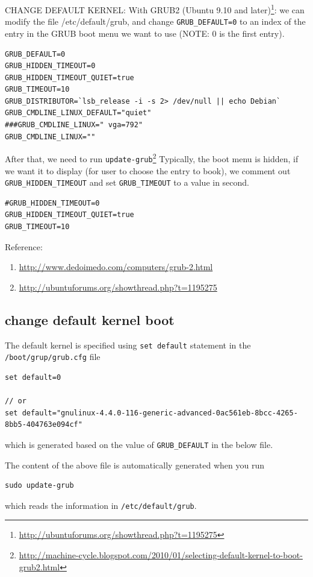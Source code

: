 CHANGE DEFAULT KERNEL: With GRUB2 (Ubuntu 9.10 and
  later)\footnote{\url{http://ubuntuforums.org/showthread.php?t=1195275}}: we
  can modify the file /etc/default/grub, and change \verb!GRUB_DEFAULT=0! to an
  index of the entry in the GRUB boot menu we want to use (NOTE: 0 is the first
  entry). 
  \begin{verbatim}
GRUB_DEFAULT=0
GRUB_HIDDEN_TIMEOUT=0
GRUB_HIDDEN_TIMEOUT_QUIET=true
GRUB_TIMEOUT=10
GRUB_DISTRIBUTOR=`lsb_release -i -s 2> /dev/null || echo Debian`
GRUB_CMDLINE_LINUX_DEFAULT="quiet"
###GRUB_CMDLINE_LINUX=" vga=792"
GRUB_CMDLINE_LINUX=""
  \end{verbatim}
After that, we need to run
\verb!update-grub!\footnote{\url{http://machine-cycle.blogspot.com/2010/01/selecting-default-kernel-to-boot-grub2.html}}
Typically, the boot menu is hidden, if we want it to display (for user to
choose the entry to book), we comment out \verb!GRUB_HIDDEN_TIMEOUT! and set
\verb!GRUB_TIMEOUT! to a value in second. 
\begin{verbatim}
#GRUB_HIDDEN_TIMEOUT=0
GRUB_HIDDEN_TIMEOUT_QUIET=true
GRUB_TIMEOUT=10
\end{verbatim}
  
  
  
  Reference:
  \begin{enumerate}
    \item \url{http://www.dedoimedo.com/computers/grub-2.html}
    \item \url{http://ubuntuforums.org/showthread.php?t=1195275}
  \end{enumerate}

\subsection{change default kernel boot}

The default kernel is specified using \verb!set default! statement in the 
\verb!/boot/grup/grub.cfg! file 
\begin{verbatim}
set default=0

// or 
set default="gnulinux-4.4.0-116-generic-advanced-0ac561eb-8bcc-4265-8bb5-404763e094cf"
\end{verbatim}
which is generated based on the value of \verb!GRUB_DEFAULT! in the below file.

The content of the above file is automatically generated when you
run
\begin{verbatim}
sudo update-grub
\end{verbatim}
which reads the information in \verb!/etc/default/grub!.

